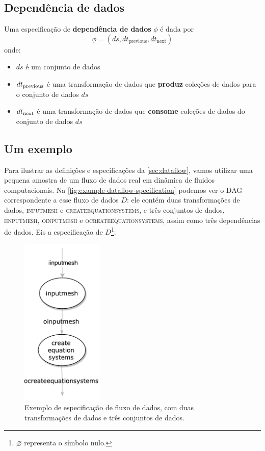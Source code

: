 \subsection{Dependência de dados}

Uma especificação de \textbf{dependência de dados} \( \phi \) é dada por \[ \phi = (ds, dt_{\textrm{previous}}, dt_{\textrm{next}}) \] onde:
\begin{itemize}
    \item \( ds \) é um conjunto de dados
    \item \( dt_{\textup{previous}} \) é uma transformação de dados que {\bf produz} coleções de dados para o conjunto de dados \( ds \)
    \item \( dt_{\textup{next}} \) é uma transformação de dados que {\bf consome} coleções de dados do conjunto de dados \( ds \)
\end{itemize}

\subsection{Um exemplo}%
\label{sec:um-exemplo-de-dataflow}

Para ilustrar as definições e especificações da \autoref{sec:dataflow}, vamos utilizar uma pequena amostra de um fluxo de dados real em dinâmica de fluidos computacionais. Na \autoref{fig:example-dataflow-specification} podemos ver o DAG correspondente a esse fluxo de dados \( D \): ele contém duas transformações de dados, \textsc{inputmesh} e \textsc{createequationsystems}, e três conjuntos de dados, \textsc{iinputmesh}, \textsc{oinputmesh} e \textsc{ocreateequationsystems}, assim como três dependências de dados. Eis a especificação de \( D \)\footnote{\( \varnothing \) representa o símbolo nulo.}:

\begin{figure}[htb]
    \centering
    \includegraphics[width=0.35\textwidth]{img/example-dataflow-specification}
    \caption[Exemplo de especificação de fluxo de dados]{Exemplo de especificação de fluxo de dados, com duas transformações de dados e três conjuntos de dados.}%
    \label{fig:example-dataflow-specification}
\end{figure}

